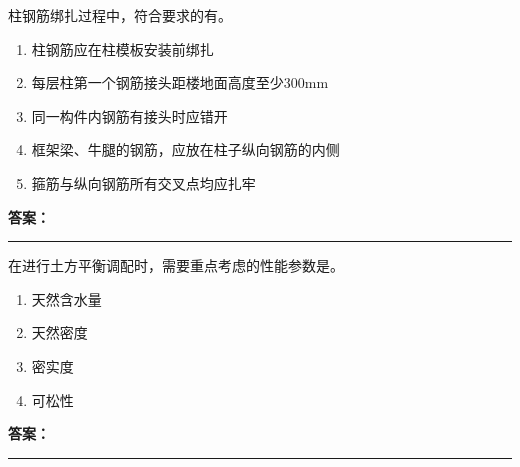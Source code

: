 \documentclass[UTF8,fontset=fandol,11pt]{ctexart}
\newcommand{\answerline}{\textcolor{answerred}{\rule{2.4cm}{0.7pt}}}
\begin{document}
\vspace{0.2em}

\begin{quizbox}[title={乱序第 19 题｜第四章混凝土结构工程}]

柱钢筋绑扎过程中，符合要求的有。\\

\begin{enumerate}[label=\Alph*.]

\item 柱钢筋应在柱模板安装前绑扎

\item 每层柱第一个钢筋接头距楼地面高度至少300mm

\item 同一构件内钢筋有接头时应错开

\item 框架梁、牛腿的钢筋，应放在柱子纵向钢筋的内侧

\item 箍筋与纵向钢筋所有交叉点均应扎牢

\end{enumerate}

\textbf{\textcolor{answerred}{答案：}} \answerline

\end{quizbox}

\vspace{0.2em}

\begin{quizbox}[title={乱序第 20 题｜第一章土方工程}]

在进行土方平衡调配时，需要重点考虑的性能参数是。\\

\begin{enumerate}[label=\Alph*.]

\item 天然含水量

\item 天然密度

\item 密实度

\item 可松性

\end{enumerate}

\textbf{\textcolor{answerred}{答案：}} \answerline

\end{quizbox}

\vspace{0.2em}
\end{document}
